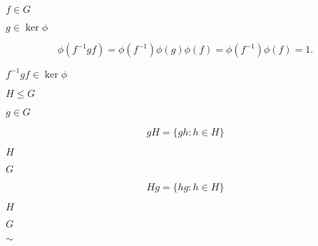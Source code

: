 \documentclass[10pt]{book}
\begin{document}
\begin{mdSnippets}
\begin{mdInlineSnippet}
$f \in G$\end{mdInlineSnippet}%
\begin{mdInlineSnippet}[b9f6226368c5569d09798f790e2771af]%
$g \in \ker \phi$\end{mdInlineSnippet}%
\begin{mdDisplaySnippet}[5b27cd70e2beb3b0a88681c733159830]%
\[%
\phi(f^{-1}gf) = \phi(f^{-1}) \phi(g) \phi(f) = \phi(f^{-1}) \phi(f) = 1.
\]%
\end{mdDisplaySnippet}%
\begin{mdInlineSnippet}%
$f^{-1}gf \in \ker \phi$\end{mdInlineSnippet}%
\begin{mdInlineSnippet}[4ee431308d78171faa2505c335201d0f]%
$H \le G$\end{mdInlineSnippet}%
\begin{mdInlineSnippet}[c9742018c5575f06f59ce542b29ad79d]%
$g \in G$\end{mdInlineSnippet}%
\begin{mdDisplaySnippet}[243951cd902b7e6c9e96b7e18f63f1fb]%
\[%
gH = \{gh : h \in H\}
\]%
\end{mdDisplaySnippet}%
\begin{mdInlineSnippet}[c1d9f50f86825a1a2302ec2449c17196]%
$H$\end{mdInlineSnippet}%
\begin{mdInlineSnippet}[dfcf28d0734569a6a693bc8194de62bf]%
$G$\end{mdInlineSnippet}%
\begin{mdDisplaySnippet}[5ab61c8a4ad226330a6dbad832f1d31d]%
\[%
Hg = \{hg : h \in H\}
\]%
\end{mdDisplaySnippet}%
\begin{mdInlineSnippet}[c1d9f50f86825a1a2302ec2449c17196]%
$H$\end{mdInlineSnippet}%
\begin{mdInlineSnippet}[dfcf28d0734569a6a693bc8194de62bf]%
$G$\end{mdInlineSnippet}%
\begin{mdInlineSnippet}[6588c95074f2609674f5fe10ab63f88f]%
$\sim$\end{mdInlineSnippet}%

\end{mdSnippets}
\end{document}
